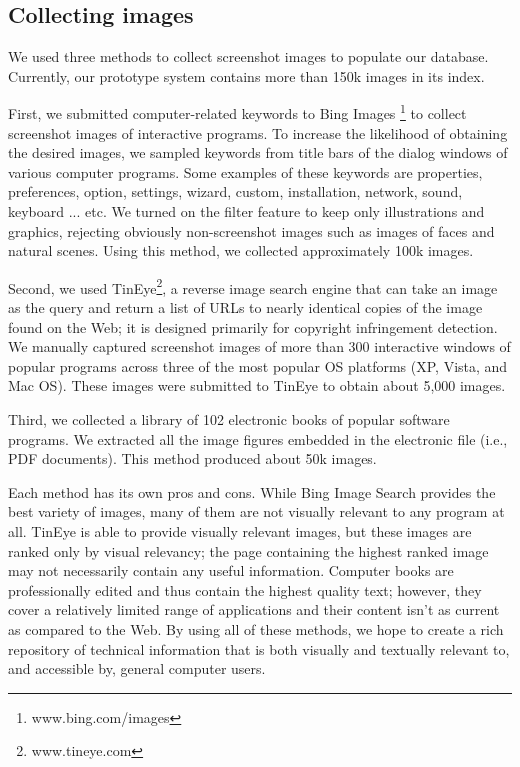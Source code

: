 \documentclass{www2010-submission}
\begin{document}
\subsection{Collecting images}
\label{sec:collecting_images}


We used three methods to collect screenshot images to populate our
database. Currently, our prototype system contains more than 150k
images in its index.

First, we submitted computer-related keywords to Bing Images
\footnote{www.bing.com/images} to collect screenshot images of
interactive programs. To increase the likelihood of obtaining the
desired images, we sampled keywords from title bars of the dialog
windows of various computer programs. Some examples of these keywords
are properties, preferences, option, settings, wizard, custom,
installation, network, sound, keyboard ... etc. We turned on the
filter feature to keep only illustrations and graphics, rejecting
obviously non-screenshot images such as images of faces and natural
scenes.  Using this method, we collected approximately 100k images.

Second, we used TinEye\footnote{www.tineye.com}, a reverse image
search engine that can take an image as the query and return a list of
URLs to nearly identical copies of the image found on the Web; it is
designed primarily for copyright infringement detection. We manually
captured screenshot images of more than 300 interactive windows of
popular programs across three of the most popular OS platforms (XP,
Vista, and Mac OS). These images were submitted to TinEye to obtain
about 5,000 images.

Third, we collected a library of 102 electronic books of popular
software programs. We extracted all the image figures embedded in the
electronic file (i.e., PDF documents). This method produced about
50k images.

Each method has its own pros and cons. While Bing Image Search
provides the best variety of images, many of them are not visually
relevant to any program at all. TinEye is able to provide visually
relevant images, but these images are ranked only by visual
relevancy; the page containing the highest ranked image may not
necessarily contain any useful information. Computer books are
professionally edited and thus contain the highest quality
text; however, they cover a relatively limited range of applications
and their content isn't as current as compared to the Web. By
using all of these methods, we hope to create a rich repository of
technical information that is both visually and textually relevant
to, and accessible by, general computer users.
 
\end{document}
